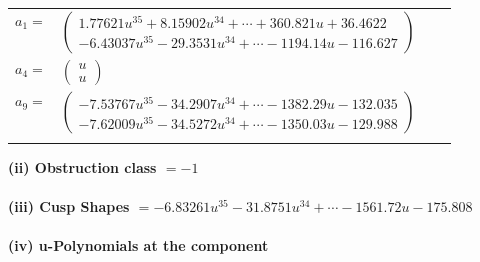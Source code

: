 \documentclass[1p]{elsarticle_modified}
\theoremstyle{definition}
\begin{document}
\begin{tabular}{m{7pt} m{180pt} m{7pt} m{180pt} }
\flushright $a_{1}=$&$\begin{pmatrix}1.77621 u^{35}+8.15902 u^{34}+\cdots+360.821 u+36.4622\\-6.43037 u^{35}-29.3531 u^{34}+\cdots-1194.14 u-116.627\end{pmatrix}$ \\
\flushright $a_{4}=$&$\begin{pmatrix}u\\u\end{pmatrix}$ \\
\flushright $a_{9}=$&$\begin{pmatrix}-7.53767 u^{35}-34.2907 u^{34}+\cdots-1382.29 u-132.035\\-7.62009 u^{35}-34.5272 u^{34}+\cdots-1350.03 u-129.988\end{pmatrix}$\\&\end{tabular}
\flushleft \textbf{(ii) Obstruction class $= -1$}\\~\\
\flushleft \textbf{(iii) Cusp Shapes $= -6.83261 u^{35}-31.8751 u^{34}+\cdots-1561.72 u-175.808$}\\~\\
\newpage\renewcommand{\arraystretch}{1}
\flushleft \textbf{(iv) u-Polynomials at the component}\newline \\
\end{document}
